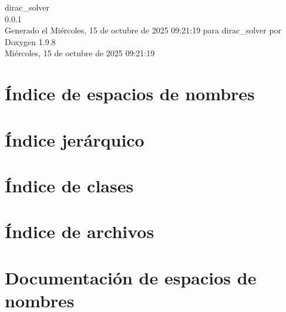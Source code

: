 \documentclass[twoside]{book}
\newcommand{\+}{\discretionary{\mbox{\scriptsize$\hookleftarrow$}}{}{}}
\newcommand{\clearemptydoublepage}{%
    \newpage{\pagestyle{empty}\cleardoublepage}%
  }
\begin{document}
  \raggedbottom
    \hypersetup{pageanchor=false,
                bookmarksnumbered=true,
                pdfencoding=unicode
               }
  \begin{titlepage}
  \vspace*{7cm}
  \begin{center}%
  {\Large dirac\+\_\+solver}\\
  [1ex]\large 0.\+0.\+1 \\
  \vspace*{1cm}
  {\large Generado el Miércoles, 15 de octubre de 2025 09\+:21\+:19 para dirac\+\_\+solver por Doxygen 1.9.8}\\
    \vspace*{0.5cm}
    {\small Miércoles, 15 de octubre de 2025 09:21:19}
  \end{center}
  \end{titlepage}
  \clearemptydoublepage
  \tableofcontents
  \clearemptydoublepage
  \hypersetup{pageanchor=true}








\chapter{Índice de espacios de nombres}

\chapter{Índice jerárquico}

\chapter{Índice de clases}

\chapter{Índice de archivos}

\chapter{Documentación de espacios de nombres}






\end{document}
